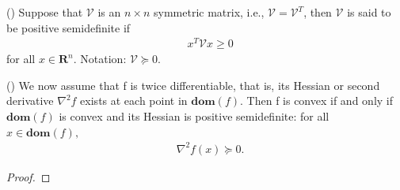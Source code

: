 \begin{definition}\label{posdef}
(\cite{doi:https://doi.org/10.1002/9780470173862.app3})
Suppose that $\mathcal{V}$ is an $n \times n$ symmetric matrix, i.e., $\mathcal{V}=\mathcal{V}^{T}$, then $\mathcal{V}$ is said to be positive semidefinite if 
\begin{equation*}\label{eq:6}\tag{2.2.3}
\begin{aligned}
    &x^{T} \mathcal{V} x \geq 0 
\end{aligned}
\end{equation*}
for all $x \in \mathbf{R}^{n}$. Notation: $\mathcal{V} \succeq 0.$
\end{definition}
\begin{lemma}\label{second-ord-cond}
(\cite[71]{boyd2004convex})
We now assume that f is twice differentiable, that is, its Hessian or second derivative $\nabla^{2}f$ exists at each point in $\textbf{dom} (f)$. Then f is convex if and only if $\textbf{dom} (f)$ is convex and its Hessian is positive semidefinite: for all $x \in \textbf{dom} (f),$ 
\begin{equation*}\label{eq:9}\tag{2.2.4}
\begin{aligned}
    &\nabla^{2}f(x) \succeq 0.
\end{aligned}
\end{equation*}
\end{lemma}
\begin{proof}
    
\end{proof}

\newpage
